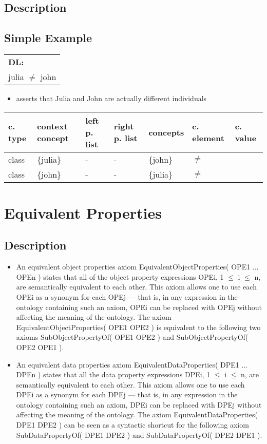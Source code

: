 \documentclass{llncs}
\newenvironment{gcotable}{
  \scriptsize
  \sffamily
  \vspace{0.3cm}
  \begin{tabular}{l|l|l|l|l|l|l}
  \hline
  \textbf{c. type} & \textbf{context concept} & \textbf{left p. list} & \textbf{right p. list} & \textbf{concepts} & \textbf{c. element} & \textbf{c. value} \\
  \hline

}{
  \hline
  \end{tabular}
  \linebreak
}
\newenvironment{DL}{
  \scriptsize
  \sffamily
  \vspace{0.3cm}
  \begin{tabular}{l}
	\textbf{DL:} \\

}{
  \end{tabular}
  \linebreak
}
\begin{document}
\subsection{Description}

\subsection{Simple Example}

\begin{DL}
julia $\ne$ john
\end{DL}

\begin{itemize}
	\item asserts that Julia and John are actually different individuals
\end{itemize}

\begin{gcotable}
class & \{julia\} & - & - & \{john\} & $\ne$ \\
class & \{john\} & - & - & \{julia\} & $\ne$ \\
\end{gcotable}

\section{Equivalent Properties}

\subsection{Description}

\begin{itemize}
	\item An equivalent object properties axiom EquivalentObjectProperties( OPE1 ... OPEn ) states that all of the object property expressions OPEi, 1 $\leq$ i $\leq$ n, are semantically equivalent to each other. This axiom allows one to use each OPEi as a synonym for each OPEj — that is, in any expression in the ontology containing such an axiom, OPEi can be replaced with OPEj without affecting the meaning of the ontology. The axiom EquivalentObjectProperties( OPE1 OPE2 ) is equivalent to the following two axioms SubObjectPropertyOf( OPE1 OPE2 ) and SubObjectPropertyOf( OPE2 OPE1 ).
	\item An equivalent data properties axiom EquivalentDataProperties( DPE1 ... DPEn ) states that all the data property expressions DPEi, 1 $\leq$ i $\leq$ n, are semantically equivalent to each other. This axiom allows one to use each DPEi as a synonym for each DPEj — that is, in any expression in the ontology containing such an axiom, DPEi can be replaced with DPEj without affecting the meaning of the ontology. The axiom EquivalentDataProperties( DPE1 DPE2 ) can be seen as a syntactic shortcut for the following axiom SubDataPropertyOf( DPE1 DPE2 ) and SubDataPropertyOf( DPE2 DPE1 ).

\end{itemize}
\end{document}
